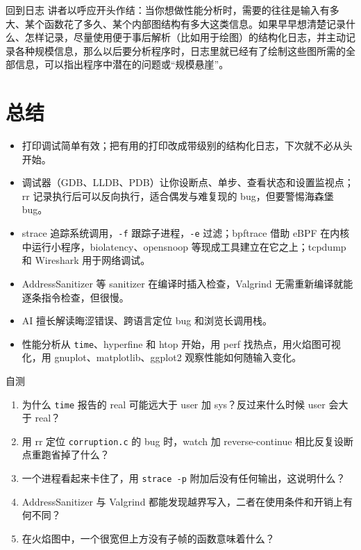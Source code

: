 \documentclass[a4paper]{article}
\begin{document}
\begin{importantbox}{回到日志}
讲者以呼应开头作结：当你想做性能分析时，需要的往往是输入有多大、某个函数花了多久、某个内部图结构有多大这类信息。如果早早想清楚记录什么、怎样记录，尽量使用便于事后解析（比如用于绘图）的结构化日志，并主动记录各种规模信息，那么以后要分析程序时，日志里就已经有了绘制这些图所需的全部信息，可以指出程序中潜在的问题或“规模悬崖”。
\end{importantbox}

\section{总结}

\begin{itemize}
\item 打印调试简单有效；把有用的打印改成带级别的结构化日志，下次就不必从头开始。
\item 调试器（GDB、LLDB、PDB）让你设断点、单步、查看状态和设置监视点；rr 记录执行后可以反向执行，适合偶发与难复现的 bug，但要警惕海森堡 bug。
\item strace 追踪系统调用，\texttt{-f} 跟踪子进程，\texttt{-e} 过滤；bpftrace 借助 eBPF 在内核中运行小程序，biolatency、opensnoop 等现成工具建立在它之上；tcpdump 和 Wireshark 用于网络调试。
\item AddressSanitizer 等 sanitizer 在编译时插入检查，Valgrind 无需重新编译就能逐条指令检查，但很慢。
\item AI 擅长解读晦涩错误、跨语言定位 bug 和浏览长调用栈。
\item 性能分析从 \texttt{time}、hyperfine 和 htop 开始，用 perf 找热点，用火焰图可视化，用 gnuplot、matplotlib、ggplot2 观察性能如何随输入变化。
\end{itemize}

\begin{practicebox}{自测}
\begin{enumerate}
\item 为什么 \texttt{time} 报告的 real 可能远大于 user 加 sys？反过来什么时候 user 会大于 real？
\item 用 rr 定位 \texttt{corruption.c} 的 bug 时，watch 加 reverse-continue 相比反复设断点重跑省掉了什么？
\item 一个进程看起来卡住了，用 \texttt{strace -p} 附加后没有任何输出，这说明什么？
\item AddressSanitizer 与 Valgrind 都能发现越界写入，二者在使用条件和开销上有何不同？
\item 在火焰图中，一个很宽但上方没有子帧的函数意味着什么？
\end{enumerate}
\end{practicebox}
\end{document}
